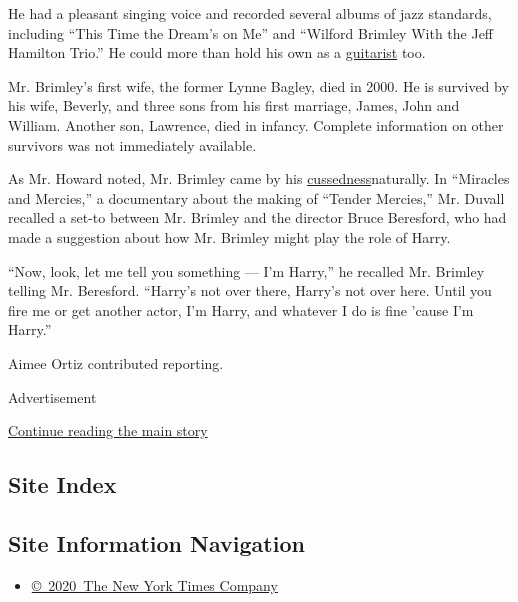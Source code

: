 He had a pleasant singing voice and recorded several albums of jazz
standards, including ``This Time the Dream's on Me'' and ``Wilford
Brimley With the Jeff Hamilton Trio.'' He could more than hold his own
as a \href{https://www.youtube.com/watch?v=WAft2naOgGc}{guitarist} too.

Mr. Brimley's first wife, the former Lynne Bagley, died in 2000. He is
survived by his wife, Beverly, and three sons from his first marriage,
James, John and William. Another son, Lawrence, died in infancy.
Complete information on other survivors was not immediately available.

As Mr. Howard noted, Mr. Brimley came by his
\href{https://www.youtube.com/watch?v=DLqX7Vi9yT8\&list=PLy1Yuw2wBXtCMd3A4mbt2x4Z8ty3S_YFF}{cussedness}naturally.
In ``Miracles and Mercies,'' a documentary about the making of ``Tender
Mercies,'' Mr. Duvall recalled a set-to between Mr. Brimley and the
director Bruce Beresford, who had made a suggestion about how Mr.
Brimley might play the role of Harry.

``Now, look, let me tell you something --- I'm Harry,'' he recalled Mr.
Brimley telling Mr. Beresford. ``Harry's not over there, Harry's not
over here. Until you fire me or get another actor, I'm Harry, and
whatever I do is fine 'cause I'm Harry.''

Aimee Ortiz contributed reporting.

Advertisement

\protect\hyperlink{after-bottom}{Continue reading the main story}

\hypertarget{site-index}{%
\subsection{Site Index}\label{site-index}}

\hypertarget{site-information-navigation}{%
\subsection{Site Information
Navigation}\label{site-information-navigation}}

\begin{itemize}
\tightlist
\item
  \href{https://help.nytimes.com/hc/en-us/articles/115014792127-Copyright-notice}{©~2020~The
  New York Times Company}
\end{itemize}

